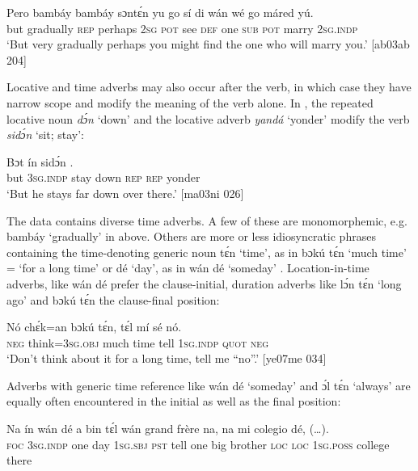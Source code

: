 \ea%
    \label{ex:key:840}
    \gll Pero  bambáy    bambáy  sɔntɛ́n  yu  go  sí  di  wán  
wé  go  máred  yú.    \\
but    gradually  \textsc{rep}    perhaps  \textsc{2sg}  \textsc{pot}  see  \textsc{def}  one  
\textsc{sub}  \textsc{pot}  marry  \textsc{2sg.indp}\\

\glt ‘But very gradually perhaps you might find the one who will marry you.’ [ab03ab 204]
\z

Locative and time adverbs may also occur after the verb, in which case they have narrow scope and modify the meaning of the verb alone. In , the repeated locative noun \textit{dɔ́n} ‘down’ and the locative adverb\textit{ yandá} ‘yonder’ modify the verb \textit{sidɔ́n} ‘sit; stay’: 


\ea%
    \label{ex:key:841}
    \gll Bɔt  ín    sidɔ́n          .\\
but  \textsc{3sg.indp}  stay    down  \textsc{rep}  \textsc{rep}  yonder\\

\glt ‘But he stays far down over there.’ [ma03ni 026]
\z

The data contains diverse time adverbs. A few of these are monomorphemic, e.g. bambáy ‘gradually’ in  above. Others are more or less idiosyncratic phrases containing the time-denoting generic noun tɛ́n ‘time’, as in bɔkú tɛ́n ‘much time’ = ‘for a long time’  or dé ‘day’, as in wán dé ‘someday’ . Location{\fff}-in-time adverbs, like wán dé prefer the clause-initial, duration adverbs like lɔ́n tɛ́n ‘long ago’ and bɔkú tɛ́n the clause-final position: 


\ea%
    \label{ex:key:842}
    \gll Nó  chɛ́k=an    bɔkú  tɛ́n,    tɛ́l  mí    sé    nó.\\
\textsc{neg}  think=\textsc{3sg.obj}  much  time    tell  \textsc{1sg.indp}  \textsc{quot}    \textsc{neg}\\

\glt ‘Don’t think about it for a long time, tell me “no”.’ [ye07me 034]
\z

Adverbs with generic time reference like wán dé ‘someday’ and ɔ́l tɛ́n ‘always’ are equally often encountered in the initial as well as the final position: 


\ea%
    \label{ex:key:843}
    \gll Na  ín    wán    dé  a    bin  tɛ́l  wán    grand  frère     na, 
na  mi    colegio  dé,    (…).\\
\textsc{foc}  \textsc{3sg.indp}  one    day  \textsc{1sg.sbj}  \textsc{pst}  tell  one    big     brother    \textsc{loc} 
\textsc{loc}  \textsc{1sg.poss}  college  there\\

